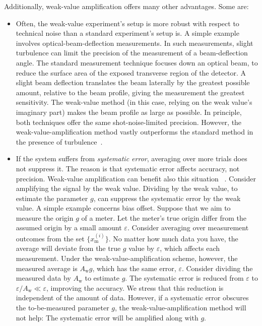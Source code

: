 \documentclass[%
 reprint,
superscriptaddress,
nofootinbib,
bibnotes,
 amsmath,amssymb,
 aps,
]{revtex4-1}
\theoremstyle{plain}
\newcommand{\Dave}[1]{\textcolor{black}{#1} }
\renewcommand{\epsilon}{\varepsilon}
\begin{document}
Additionally, weak-value amplification offers many other advantages.  Some are:
\begin{itemize}
    \item Often, 
    the weak-value experiment's setup is more robust with respect to technical noise than a standard experiment's setup is.  A simple example involves optical-beam-deflection measurements. In such measurements, 
    slight turbulence can 
    limit the precision of the measurement of a beam-deflection angle.  The standard measurement technique focuses down an optical beam, to reduce the surface area of the exposed transverse region of the detector.
    A slight beam deflection translates the beam laterally by the greatest possible amount, relative to the beam profile, giving the measurement the greatest sensitivity. 
    The weak-value method (in this case, relying on the weak value's imaginary part) makes the beam profile as large as possible. In principle, both techniques offer the same shot-noise-limited precision. However, the weak-value-amplification method vastly outperforms the standard method in the presence of turbulence~\cite{Jordan14}. 
    
    \item 
    If the system suffers from {\it systematic error}, averaging over more trials does not suppress it. 
    The reason is that systematic error affects accuracy, not precision. Weak-value amplification can benefit also this situation~\Dave{\cite{feizpour2011amplifying, Jordan14, magana2014amplification, Pang16, sinclair2017weak}}.  Consider amplifying the signal by the weak value. 
    Dividing by the weak value, to estimate the parameter $g$, can suppress the systematic error by the weak value. 
    A simple example concerns bias offset. Suppose
    that we aim to measure the origin $g$ of a meter.
    Let the meter's true origin differ from the assumed origin by a small amount $\epsilon$.  
    Consider averaging over measurement outcomes from the set $\{x_{\mathrm{m}}^{(i)}\}$. No matter how much data you have, the average
    will deviate from the true $g$ value 
    by $\epsilon$, which affects each measurement. Under the weak-value-amplification scheme, however, the measured average is $A_{\mathrm{w}} g$, which has the same error, $\epsilon$.  Consider dividing the measured data by $A_{\mathrm{w}}$ to estimate $g$. The systematic error is reduced from $\epsilon$ to $\epsilon/A_{\mathrm{w}} \ll \epsilon$,  improving the accuracy.  We stress that this reduction is independent of the amount of data.  However, if 
    a systematic error obscures the to-be-measured parameter $g$,
    the weak-value-amplification method will not help: The systematic error will be amplified along with $g$.
    

\end{itemize}
\end{document}
